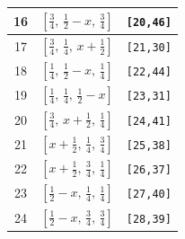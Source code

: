 \documentclass[fleqn,8pt]{jsarticle}
\begin{document}
\begin{longtable}{ccc}
16 & $\left[ \frac{3}{4},\, \frac{1}{2} - x,\, \frac{3}{4} \right]$ & {\tt [20,46]} \\ \hline
17 & $\left[ \frac{3}{4},\, \frac{1}{4},\, x + \frac{1}{2} \right]$ & {\tt [21,30]} \\ \hline
18 & $\left[ \frac{1}{4},\, \frac{1}{2} - x,\, \frac{1}{4} \right]$ & {\tt [22,44]} \\ \hline
19 & $\left[ \frac{1}{4},\, \frac{1}{4},\, \frac{1}{2} - x \right]$ & {\tt [23,31]} \\ \hline
20 & $\left[ \frac{3}{4},\, x + \frac{1}{2},\, \frac{1}{4} \right]$ & {\tt [24,41]} \\ \hline
21 & $\left[ x + \frac{1}{2},\, \frac{1}{4},\, \frac{3}{4} \right]$ & {\tt [25,38]} \\ \hline
22 & $\left[ x + \frac{1}{2},\, \frac{3}{4},\, \frac{1}{4} \right]$ & {\tt [26,37]} \\ \hline
23 & $\left[ \frac{1}{2} - x,\, \frac{1}{4},\, \frac{1}{4} \right]$ & {\tt [27,40]} \\ \hline
24 & $\left[ \frac{1}{2} - x,\, \frac{3}{4},\, \frac{3}{4} \right]$ & {\tt [28,39]} \\
\end{longtable}
\renewcommand{\arraystretch}{1.2}
\end{document}
